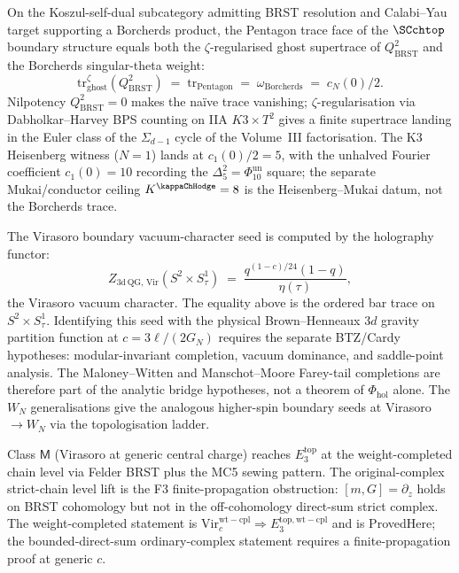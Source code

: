 \begin{remark}
\label{rem:v2-preface-three-factor-UTI}
On the Koszul-self-dual subcategory admitting BRST resolution and
Calabi--Yau target supporting a Borcherds product, the Pentagon
trace face of the $\SCchtop$ boundary structure equals both the
$\zeta$-regularised ghost supertrace of $Q_{\mathrm{BRST}}^2$ and
the Borcherds singular-theta weight:
\[
\mathrm{tr}^{\zeta}_{\mathrm{ghost}}(Q_{\mathrm{BRST}}^2)
\;=\; \mathrm{tr}_{\mathrm{Pentagon}}
\;=\; \omega_{\mathrm{Borcherds}}
\;=\; c_N(0)/2.
\]
Nilpotency $Q_{\mathrm{BRST}}^2=0$ makes the na\"ive trace
vanishing; $\zeta$-regularisation via Dabholkar--Harvey BPS
counting on IIA $K3\times T^2$ gives a finite supertrace landing
in the Euler class of the $\Sigma_{d-1}$ cycle of the Volume~III
factorisation. The K3 Heisenberg witness ($N=1$) lands at
$c_1(0)/2 = 5$, with the unhalved Fourier coefficient
$c_1(0) = 10$ recording the $\Delta_5^2 = \Phi_{10}^{\mathrm{un}}$
square; the separate Mukai/conductor ceiling
$K^{\kappaChHodge}=8$ is the Heisenberg--Mukai datum, not the
Borcherds trace.
\end{remark}

\begin{remark}
\label{rem:v2-preface-3dqg-partition-function}
The Virasoro boundary vacuum-character seed is computed by the
holography functor:
\[
Z_{3\mathrm{d\,QG,\,Vir}}(S^2\times S^1_\tau)
\;=\; \frac{q^{(1-c)/24}(1-q)}{\eta(\tau)},
\]
the Virasoro vacuum character. The equality above is the ordered bar
trace on $S^2\times S^1_\tau$. Identifying this seed with the
physical Brown--Henneaux $3d$ gravity partition function at
$c=3\ell/(2G_N)$ requires the separate BTZ/Cardy hypotheses:
modular-invariant completion, vacuum dominance, and saddle-point
analysis. The Maloney--Witten and Manschot--Moore Farey-tail
completions are therefore part of the analytic bridge hypotheses,
not a theorem of $\Phi_{\mathrm{hol}}$ alone. The $W_N$
generalisations give the analogous higher-spin boundary seeds at
Virasoro $\to W_N$ via the topologisation ladder.
\end{remark}

\begin{remark}
\label{rem:v2-preface-weight-completed-class-M}
Class $\mathsf M$ (Virasoro at generic central charge) reaches
$E_3^{\mathrm{top}}$ at the weight-completed chain level via
Felder BRST plus the MC5 sewing pattern. The original-complex
strict-chain level lift is the F3 finite-propagation obstruction:
$[m,G]=\partial_z$ holds on
BRST cohomology but not in the off-cohomology direct-sum strict
complex. The weight-completed statement is
$\mathrm{Vir}_c^{\mathrm{wt-cpl}} \Longrightarrow E_3^{\mathrm{top,wt-cpl}}$
and is ProvedHere; the bounded-direct-sum ordinary-complex
statement requires a finite-propagation proof at generic $c$.
\end{remark}

